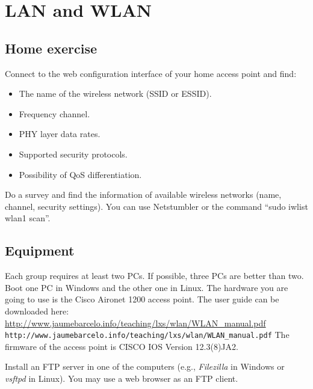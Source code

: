 \chapter{LAN and WLAN}

\section{Home exercise}

Connect to the web configuration interface of your home access point and find:
\begin{itemize}
\item The name of the wireless network (SSID or ESSID).
\item Frequency channel.
\item PHY layer data rates.
\item Supported security protocols.
\item Possibility of QoS differentiation.
\end{itemize}

Do a survey and find the information of available wireless networks (name, channel, security settings).
You can use Netstumbler or the command ``sudo iwlist wlan1 scan''.

\section{Equipment}

Each group requires at least two PCs.
If possible, three PCs are better than two.
Boot one PC in Windows and the other one in Linux.
The hardware you are going to use is the Cisco Aironet 1200 access point.
The user guide can be downloaded here: 
\ifpdf 
\url{http://www.jaumebarcelo.info/teaching/lxs/wlan/WLAN_manual.pdf}
\else
\texttt{http://www.jaumebarcelo.info/teaching/lxs/wlan/WLAN\_manual.pdf}
\fi
The firmware of the access point is CISCO IOS Version 12.3(8)JA2.

Install an FTP server in one of the computers (e.g., \emph{Filezilla} in Windows or \emph{vsftpd} in Linux). You may use a web browser as an FTP client.

